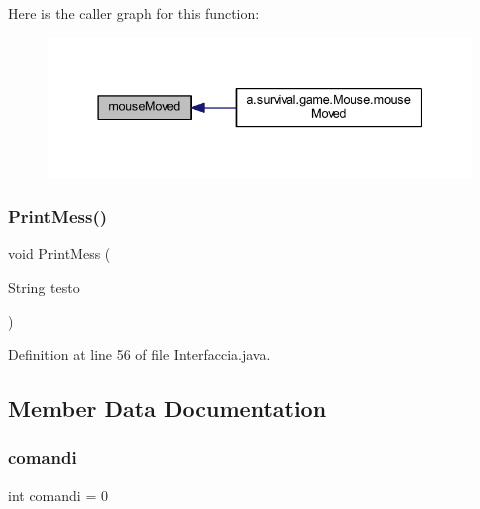 Here is the caller graph for this function\+:
\nopagebreak
\begin{figure}[H]
\begin{center}
\leavevmode
\includegraphics[width=337pt]{classa_1_1survival_1_1game_1_1_interfaccia_a2ca251710b65639ec80bc141edde60aa_icgraph}
\end{center}
\end{figure}
\mbox{\label{classa_1_1survival_1_1game_1_1_interfaccia_ae9b898a41ae435279045781f39227899}} 
\subsubsection{\texorpdfstring{Print\+Mess()}{PrintMess()}}
{\footnotesize\ttfamily void Print\+Mess (\begin{DoxyParamCaption}\item[{String}]{testo }\end{DoxyParamCaption})}



Definition at line 56 of file Interfaccia.\+java.



\subsection{Member Data Documentation}
\mbox{\label{classa_1_1survival_1_1game_1_1_interfaccia_a649a8655713bf0e8464a2a3a957c26d4}} 
\subsubsection{\texorpdfstring{comandi}{comandi}}
{\footnotesize\ttfamily int comandi = 0}



